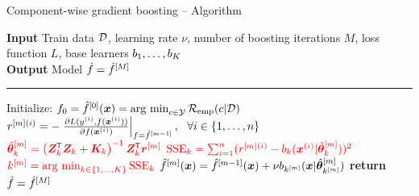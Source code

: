 \documentclass[10pt]{beamer}
\begin{document}
\begin{frame}{Component-wise gradient boosting -- Algorithm}

  \begin{algorithm}[H]
  \footnotesize
  \caption{Vanilla CWB algorithm}\label{algo:cwb}
  \hspace*{\algorithmicindent} \textbf{Input} Train data $\mathcal{D}$, learning rate $\nu$, number of boosting iterations $M$, loss\\
  \hspace*{\algorithmicindent}  function $L$, base learners $b_1, \dots, b_K$\\
  \hspace*{\algorithmicindent} \textbf{Output} Model $\hat{f} = \hat{f}^{[M]}$\vspace{0.1cm}
  \hrule
  \begin{algorithmic}[1]
      \State Initialize: $f_0 = \hat{f}^{[0]}(\bm{x}) = \operatorname{arg~min}_{c\in\mathcal{Y}}\mathcal{R}_{\text{emp}}(c|\mathcal{D})$
          \State $r^{[m](i)} = -\left.\frac{\partial L(y^{(i)}, f(\bm{x}^{(i)}))}{\partial f(\bm{x}^{(i)})}\right|_{f = \hat{f}^{[m-1]}},\ \ \forall i \in \{1, \dots, n\}$
          \color{red}
              \State $\color{red}\hat{\bm{\theta}}^{[m]}_k = \left(\bm{Z}_k^{\mkern-1.5mu\mathsf{T}} \bm{Z}_k + \bm{K}_k\right)^{-1} \bm{Z}^{\mkern-1.5mu\mathsf{T}}_k \bm{r}^{[m]}$
              \State $\color{red}\operatorname{SSE}_k = \sum_{i=1}^n(r^{[m](i)} - b_k(\bm{x}^{(i)} | \hat{\bm{\theta}}^{[m]}_k))^2$
          \EndFor
          \State $\color{red}k^{[m]} = \operatorname{arg~min}_{k\in\{1, \dots, K\}} \operatorname{SSE}_k$
          \State $\hat{f}^{[m]}(\bm{x}) = \hat{f}^{[m-1]}(\bm{x}) + \nu b_{k^{[m]}} (\bm{x} | \hat{\bm{\theta}}^{[m]}_{k^{[m]}})$
      \EndWhile
      \State \textbf{return} $\hat{f} = \hat{f}^{[M]}$
  \EndProcedure
  \end{algorithmic}
  \end{algorithm}
\end{frame}
\end{document}
